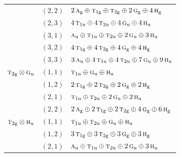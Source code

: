 \documentclass[11pt]{article}
\newcommand{\irr}[1]{\text{\normalfont\scshape #1}}
\newcommand{\ptag}[1]{\mathrm{#1}}
\begin{document}
\begin{longtable}{p{} c p{}}
 & $(2,2)$ & $2\,\irr{a}_{\ptag{g}}\oplus \irr{t}_{1\ptag{g}}\oplus \irr{t}_{2\ptag{g}}\oplus 2\,\irr{g}_{\ptag{g}}\oplus 4\,\irr{h}_{\ptag{g}}$\\

 & $(2,3)$ & $4\,\irr{t}_{1\ptag{u}}\oplus 4\,\irr{t}_{2\ptag{u}}\oplus 4\,\irr{g}_{\ptag{u}}\oplus 4\,\irr{h}_{\ptag{u}}$\\

 & $(3,1)$ & $\irr{a}_{\ptag{u}}\oplus \irr{t}_{1\ptag{u}}\oplus \irr{t}_{2\ptag{u}}\oplus 2\,\irr{g}_{\ptag{u}}\oplus 3\,\irr{h}_{\ptag{u}}$\\

 & $(3,2)$ & $4\,\irr{t}_{1\ptag{g}}\oplus 4\,\irr{t}_{2\ptag{g}}\oplus 4\,\irr{g}_{\ptag{g}}\oplus 4\,\irr{h}_{\ptag{g}}$\\

 & $(3,3)$ & $3\,\irr{a}_{\ptag{u}}\oplus 4\,\irr{t}_{1\ptag{u}}\oplus 4\,\irr{t}_{2\ptag{u}}\oplus 7\,\irr{g}_{\ptag{u}}\oplus 9\,\irr{h}_{\ptag{u}}$\\

\hline

$\irr{t}_{2\ptag{g}}\otimes \irr{g}_{\ptag{u}}$ & $(1,1)$ & $\irr{t}_{1\ptag{u}}\oplus \irr{g}_{\ptag{u}}\oplus \irr{h}_{\ptag{u}}$\\

 & $(1,2)$ & $2\,\irr{t}_{1\ptag{g}}\oplus 2\,\irr{t}_{2\ptag{g}}\oplus 2\,\irr{g}_{\ptag{g}}\oplus 2\,\irr{h}_{\ptag{g}}$\\

 & $(2,1)$ & $\irr{t}_{1\ptag{u}}\oplus \irr{t}_{2\ptag{u}}\oplus 2\,\irr{g}_{\ptag{u}}\oplus 2\,\irr{h}_{\ptag{u}}$\\

 & $(2,2)$ & $2\,\irr{a}_{\ptag{g}}\oplus 2\,\irr{t}_{1\ptag{g}}\oplus 2\,\irr{t}_{2\ptag{g}}\oplus 4\,\irr{g}_{\ptag{g}}\oplus 6\,\irr{h}_{\ptag{g}}$\\

\hline

$\irr{t}_{2\ptag{g}}\otimes \irr{h}_{\ptag{u}}$ & $(1,1)$ & $\irr{t}_{1\ptag{u}}\oplus \irr{t}_{2\ptag{u}}\oplus \irr{g}_{\ptag{u}}\oplus \irr{h}_{\ptag{u}}$\\

 & $(1,2)$ & $3\,\irr{t}_{1\ptag{g}}\oplus 3\,\irr{t}_{2\ptag{g}}\oplus 3\,\irr{g}_{\ptag{g}}\oplus 3\,\irr{h}_{\ptag{g}}$\\

 & $(2,1)$ & $\irr{a}_{\ptag{u}}\oplus \irr{t}_{1\ptag{u}}\oplus \irr{t}_{2\ptag{u}}\oplus 2\,\irr{g}_{\ptag{u}}\oplus 3\,\irr{h}_{\ptag{u}}$\\


\end{longtable}
\end{document}
